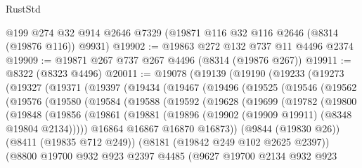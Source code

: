 \begin{lexlean}{RustStd}
\begin{coremodule}
    @199
    @274
    @32
    @914
    @2646
    @7329
    (@19871 @116 @32 @116 @2646 (@8314 (@19876 @116)) @9931)
@19902 := @19863 @272 @132 @737 @11 @4496 @2374
@19909 := @19871 @267 @737 @267 @4496 (@8314 (@19876 @267))
@19911 := @8322 (@8323 @4496)
@20011 := @19078
    (@19139
      (@19190
        (@19233
          (@19273
            (@19327
              (@19371
                (@19397
                  (@19434
                    (@19467
                      (@19496
                        (@19525
                          (@19546
                            (@19562
                              (@19576
                                (@19580
                                  (@19584
                                    (@19588
                                      (@19592
                                        (@19628
                                          (@19699
                                            (@19782
                                              (@19800
                                                (@19848
                                                  (@19856
                                                    (@19861
                                                      (@19881
                                                        (@19896
                                                          (@19902
                                                            (@19909 @19911)
                                                            (@8348 @19804 @2134)))))
                                                    @16864
                                                    @16867
                                                    @16870
                                                    @16873))
                                                (@9844 (@19830 @26))
                                                (@8411 (@19835 @712 @249))
                                                (@8181 (@19842 @249 @102 @2625 @2397))
                                                (@8800
                                                  @19700
                                                  @932
                                                  @923
                                                  @2397
                                                  @4485
                                                  (@9627
                                                    @19700
                                                    @2134
                                                    @932
                                                    @923

\end{coremodule}
\end{lexlean}

